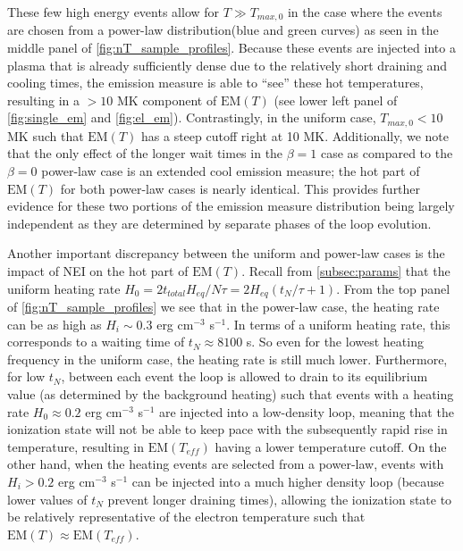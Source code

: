 \documentclass[apj]{emulateapj}
\begin{document}
	\par These few high energy events allow for $T\gg T_{max,0}$ in the case where the events are chosen from a power-law distribution(blue and green curves) as seen in the middle panel of \autoref{fig:nT_sample_profiles}. Because these events are injected into a plasma that is already sufficiently dense due to the relatively short draining and cooling times, the emission measure is able to ``see'' these hot temperatures, resulting in a $>10$ MK component of $\mathrm{EM}(T)$ (see lower left panel of \autoref{fig:single_em} and \autoref{fig:el_em}). Contrastingly, in the uniform case, $T_{max,0}<10$ MK such that $\mathrm{EM}(T)$ has a steep cutoff right at 10 MK. Additionally, we note that the only effect of the longer wait times in the $\beta=1$ case as compared to the $\beta=0$ power-law case is an extended cool emission measure; the hot part of $\mathrm{EM}(T)$ for both power-law cases is nearly identical. This provides further evidence for these two portions of the emission measure distribution being largely independent as they are determined by separate phases of the loop evolution.
	\par Another important discrepancy between the uniform and power-law cases is the impact of NEI on the hot part of $\mathrm{EM}(T)$. Recall from \autoref{subsec:params} that the uniform heating rate $H_0=2t_{total}H_{eq}/N\tau=2H_{eq}(t_N/\tau+1)$. From the top panel of \autoref{fig:nT_sample_profiles} we see that in the power-law case, the heating rate can be as high as $H_i\sim0.3$ erg cm$^{-3}$ s$^{-1}$. In terms of a uniform heating rate, this corresponds to a waiting time of $t_N\approx8100$ s. So even for the lowest heating frequency in the uniform case, the heating rate is still much lower. Furthermore, for low $t_N$, between each event the loop is allowed to drain to its equilibrium value (as determined by the background heating) such that events with a heating rate $H_0\approx0.2$ erg cm$^{-3}$ s$^{-1}$ are injected into a low-density loop, meaning that the ionization state will not be able to keep pace with the subsequently rapid rise in temperature, resulting in $\mathrm{EM}(T_{eff})$ having a lower temperature cutoff. On the other hand, when the heating events are selected from a power-law, events with $H_i>0.2$ erg cm$^{-3}$ s$^{-1}$ can be injected into a much higher density loop (because lower values of $t_N$ prevent longer draining times), allowing the ionization state to be relatively representative of the electron temperature such that $\mathrm{EM}(T)\approx\mathrm{EM}(T_{eff})$.
\end{document}
